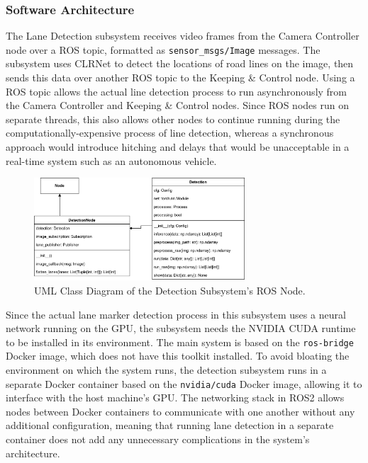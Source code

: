 \documentclass[titlepage,draft]{article}
\begin{document}
{\subsubsection{Software Architecture}

The Lane Detection subsystem receives video frames from the Camera Controller node over a ROS topic, formatted as
\texttt{sensor\_msgs/Image} messages.
The subsystem uses CLRNet to detect the locations of road lines on the image, then sends this data over another ROS topic to the
Keeping \& Control node.
Using a ROS topic allows the actual line detection process to run asynchronously from the Camera Controller and Keeping \& Control nodes.
Since ROS nodes run on separate threads, this also allows other nodes to continue running during the computationally-expensive process
of line detection, whereas a synchronous approach would introduce hitching and delays that would be unacceptable in a real-time system
such as an autonomous vehicle.

\begin{figure}
	\centering
	\includegraphics[width=0.7\textwidth]{Detection-UML}
	\caption{UML Class Diagram of the Detection Subsystem's ROS Node.}
	\label{Detection-UML}
\end{figure}

Since the actual lane marker detection process in this subsystem uses a neural network running on the GPU, the subsystem needs the
NVIDIA CUDA runtime to be installed in its environment.
The main system is based on the \texttt{ros-bridge} \cite{ROSBridge} Docker image, which does not have this toolkit installed.
To avoid bloating the environment on which the system runs, the detection subsystem runs in a separate Docker container based on the
\texttt{nvidia/cuda} Docker image, allowing it to interface with the host machine's GPU.
The networking stack in ROS2 allows nodes between Docker containers to communicate with one another without any additional configuration,
meaning that running lane detection in a separate container does not add any unnecessary complications in the system's architecture.

}
\end{document}
